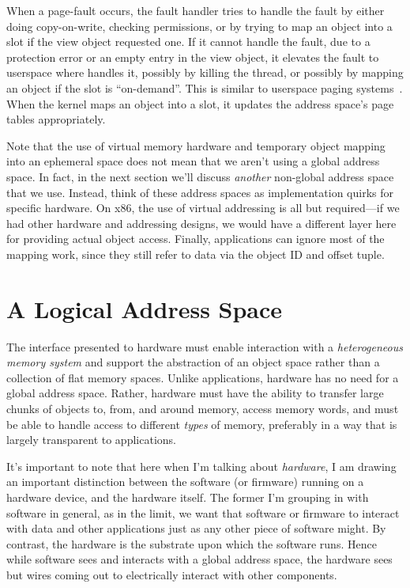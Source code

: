 When a page-fault occurs, the fault handler tries to handle the fault by either doing copy-on-write,
checking permissions, or by trying to map an object into a slot if the view object requested one.
If it cannot handle the fault, \eg due to a protection error or an empty entry in the view
object, it elevates the fault to userspace where \libcore handles it, possibly by killing the
thread, or possibly by mapping an object if the slot is ``on-demand''. This is similar to userspace
paging systems~\cite{l4,accetta:usenix86s}. When the kernel
maps an object into a slot, it updates the address space's page tables appropriately.

Note that the use of virtual memory hardware and temporary object mapping into an ephemeral space does not mean that we
aren't using a global address space. In fact, in the next section we'll discuss \emph{another} non-global address space
that we use. Instead, think of these address spaces as implementation quirks for specific hardware. On x86, the
use of virtual addressing is all but required---if we had other hardware and addressing designs, we would have a
different layer here for providing actual object access. Finally, applications can ignore most of the \libcore mapping
work, since they still refer to data via the object ID and offset tuple.

\section{A Logical Address Space}

The interface presented to hardware must enable interaction with a
\textit{heterogeneous memory system} and support the abstraction of an object space rather than a
collection of flat memory spaces. Unlike applications, hardware has no need for
a global address space. Rather, hardware must
have the ability to transfer large chunks of objects to, from, and around memory, access memory words, and must be able to
handle access to different \emph{types} of memory, preferably in a way that is largely transparent to
applications.

It's important to note that here when I'm talking about \emph{hardware}, I am drawing an important distinction between
the software (or firmware) running on a hardware device, and the hardware itself. The former I'm grouping in with
software in general, as in the limit, we want that software or firmware to interact with data and other applications
just as any other piece of software might. By contrast, the hardware is the substrate upon which the software runs.
Hence while software sees and interacts with a global address space, the hardware sees but wires coming out to
electrically interact with other components.


